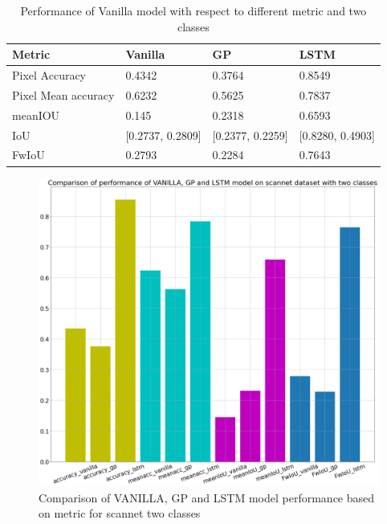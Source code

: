 	\begin{table}[h]
		\begin{center}
			\begin{tabular}{ | l | l | l | p{4cm} |}
				\hline
				
				\cellcolor{purple!30}Metric & \cellcolor{purple!30}Vanilla & \cellcolor{purple!30}GP & \cellcolor{purple!30}LSTM\\ \hline
				Pixel Accuracy & 0.4342 & 0.3764 & 0.8549\\ \hline
				Pixel Mean accuracy & 0.6232 & 0.5625 & 0.7837 \\ \hline
				meanIOU & 0.145 & 0.2318 & 0.6593 \\ \hline
				IoU & [0.2737, 0.2809] & [0.2377, 0.2259] & [0.8280, 0.4903] \\ \hline
				FwIoU & 0.2793 & 0.2284 & 0.7643 \\ \hline
				\hline
			\end{tabular}
			\caption{Performance of Vanilla model with respect to different metric and two classes}
			\label{table:unet_two_classes}
		\end{center}
	\end{table}
	
	
	\begin{figure}
		\centering
		\includegraphics[width=12cm]{images/scannet_performance_two_classes.png}
		\caption{Comparison of VANILLA, GP and LSTM model performance based on metric for scannet two classes}
		\label{fig:unet_model_metric_comparison}
	\end{figure}

